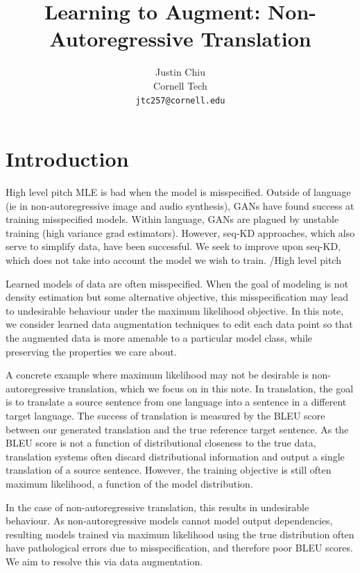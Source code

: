 \documentclass[11pt]{article}
\title{Learning to Augment: Non-Autoregressive Translation}
\author{Justin Chiu \\
  Cornell Tech \\
  \texttt{jtc257@cornell.edu}}
\begin{document}
\maketitle
\begin{abstract}
\end{abstract}

\section{Introduction}
{\color{red}High level pitch}
MLE is bad when the model is misspecified.
Outside of language (ie in non-autoregressive image and audio synthesis),
GANs have found success at training misspecified models.
Within language, GANs are plagued by unstable training (high variance grad estimators).
However, seq-KD approaches, which also serve to simplify data, have been successful.
We seek to improve upon seq-KD, which does not take into account the model we wish to train.
{\color{red}/High level pitch}

Learned models of data are often misspecified.
When the goal of modeling is not density estimation
but some alternative objective, this misspecification may lead to undesirable
behaviour under the maximum likelihood objective.
In this note, we consider learned data augmentation techniques to edit
each data point so that the augmented data is more amenable to a particular model class,
while preserving the properties we care about.

A concrete example where maximum likelihood may not be desirable is
non-autoregressive translation, which we focus on in this note.
In translation, the goal is to translate a source sentence from one language
into a sentence in a different target language.
The success of translation is measured by the BLEU score
between our generated translation and the true reference target sentence.
As the BLEU score is not a function of distributional closeness to the true data,
translation systems often discard distributional information and
output a single translation of a source sentence.
However, the training objective is still often maximum likelihood, a function of
the model distribution.

In the case of non-autoregressive translation, this results in undesirable behaviour.
As non-autoregressive models cannot model output dependencies,
resulting models trained via maximum likelihood using the true distribution
often have pathological errors due to misspecification,
and therefore poor BLEU scores.
We aim to resolve this via data augmentation.
\end{document}
